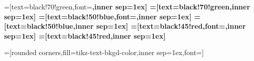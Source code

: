 
=[text=black!70!green,font=\bfseries\sffamily,inner sep=1ex]
=[text=black!70!green,inner sep=1ex]
=[text=black!50!blue,font=\bfseries\sffamily,inner sep=1ex]
=[text=black!50!blue,inner sep=1ex]
=[text=black!45!red,font=\bfseries\sffamily,inner sep=1ex]
=[text=black!45!red,inner sep=1ex]

=[rounded corners,fill=tikz-text-bkgd-color,inner sep=1ex,font=\small]

